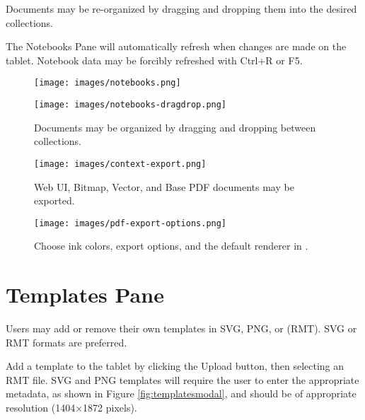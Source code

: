 Documents may be re-organized by dragging and dropping them into the desired collections.

The Notebooks Pane will automatically refresh when changes are made on the tablet. Notebook data may be forcibly refreshed with Ctrl+R or F5.

\vfill

\begin{figure}[h]
  \centering
  \texttt{[image: images/notebooks.png]}
  \caption{}
  \label{fig:notebookspane}
\end{figure}

\newpage
\mbox{}

\vfill

\begin{figure}[h]
  \centering
  \texttt{[image: images/notebooks-dragdrop.png]}
  \caption{Documents may be organized by dragging and dropping between collections.}
  \label{fig:docexport}
\end{figure}

\vfill


\begin{figure}[h]
  \centering
  \texttt{[image: images/context-export.png]}
  \caption{Web UI, Bitmap, Vector, and Base PDF documents may be exported.}
  \label{fig:contextexport}
\end{figure}

\vfill

\newpage
\mbox{}
\vfill

\begin{figure}[h]
  \centering
  \texttt{[image: images/pdf-export-options.png]}
  \caption{Choose ink colors, export options, and the default renderer in .}
  \label{fig:pdfexport}
\end{figure}

\vfill



\newpage
\section{Templates Pane}
\label{sec:templatespane}
Users may add or remove their own templates in SVG, PNG, or  (RMT). SVG or RMT formats are preferred.

Add a template to the tablet by clicking the Upload button, then selecting an RMT file. SVG and PNG templates will require the user to enter the appropriate metadata, as shown in Figure \ref{fig:templatesmodal}, and should be of appropriate resolution (1404$\times$1872 pixels).

